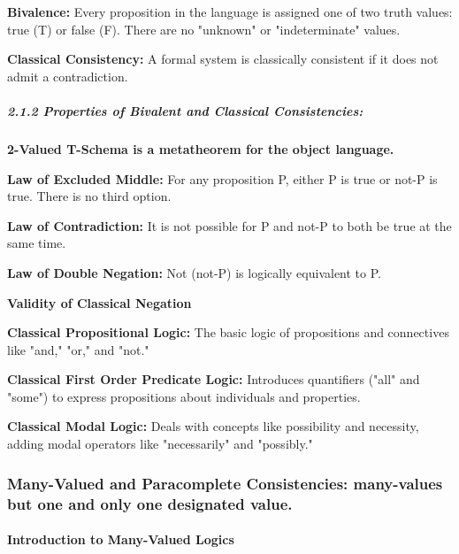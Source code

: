 \textbf{Bivalence:} Every proposition in the language is assigned one of
two truth values: true (T) or false (F). There are no "unknown" or
"indeterminate" values.

\textbf{Classical Consistency:} A formal system is classically
consistent if it does not admit a contradiction.

\hypertarget{properties-of-bivalent-and-classical-consistencies}{%
\subparagraph*{2.1.2 Properties of Bivalent and Classical
Consistencies:}\label{properties-of-bivalent-and-classical-consistencies}}

\textbf{2-Valued T-Schema is a metatheorem for the object language.}

\textbf{Law of Excluded Middle:} For any proposition P, either P is true
or not-P is true. There is no third option.

\textbf{Law of Contradiction:} It is not possible for P and not-P to
both be true at the same time.

\textbf{Law of Double Negation:} Not (not-P) is logically equivalent to
P.

\textbf{Validity of Classical Negation}

\textbf{Classical Propositional Logic:} The basic logic of propositions
and connectives like "and," "or," and "not."

\textbf{Classical First Order Predicate Logic:} Introduces quantifiers
("all" and "some") to express propositions about individuals and
properties.

\textbf{Classical Modal Logic:} Deals with concepts like possibility and
necessity, adding modal operators like "necessarily" and "possibly."

\hypertarget{many-valued-and-paracomplete-consistencies-many-values-but-one-and-only-one-designated-value.}{%
\subsubsection*{Many-Valued and Paracomplete Consistencies: many-values
but one and only one designated
value.}\label{many-valued-and-paracomplete-consistencies-many-values-but-one-and-only-one-designated-value.}}

\hypertarget{introduction-to-many-valued-logics}{%
\paragraph*{Introduction to Many-Valued
Logics}\label{introduction-to-many-valued-logics}}

